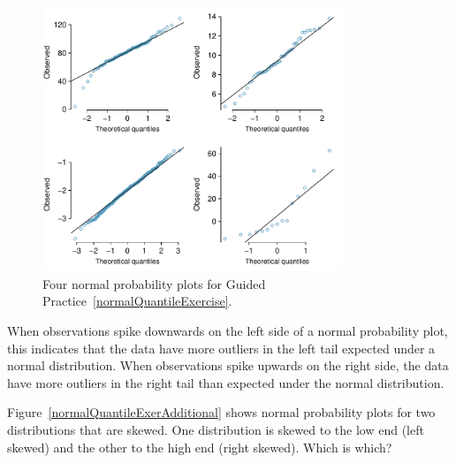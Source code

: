 \begin{figure}[h]
	\centering
	\includegraphics[width=0.80\textwidth]{ch_distributions_oi_biostat/figures/normalQuantileExer/normalQuantileExer}
	\caption{Four normal probability plots for Guided Practice~\ref{normalQuantileExercise}.}
	\label{normalQuantileExer}
\end{figure}

\textD{\newpage}

When observations spike downwards on the left side of a normal probability plot, this indicates that the data have more outliers in the left tail expected under a normal distribution. When observations spike upwards on the right side, the data have more outliers in the right tail than expected under the normal distribution.

\begin{exercisewrap}
\begin{nexercise}\label{normalQuantileExerciseAdditional}%
Figure~\ref{normalQuantileExerAdditional} shows normal probability plots for two distributions that are skewed. One distribution is skewed to the low end (left skewed) and the other to the high end (right skewed). Which is which?\footnotemark{}
\end{nexercise}
\end{exercisewrap}

